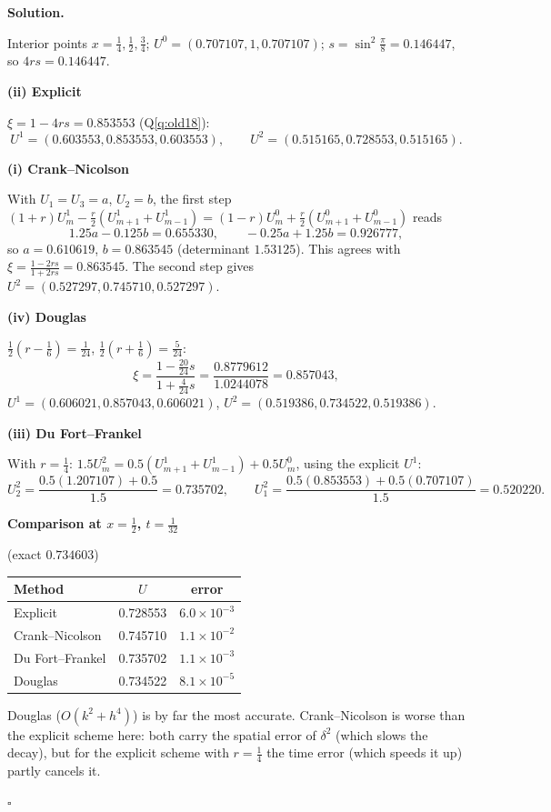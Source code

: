 \documentclass[11pt,a4paper]{article}
\newenvironment{solution}
  {\par\noindent\textbf{Solution.}\par\nobreak}
  {\par\nobreak\noindent\hfill\(\square\)\par}
\newcommand{\step}[1]{\par\addvspace{0.5em}\noindent\textbf{#1}\par\nobreak}
\begin{document}
\begin{solution}
Interior points \(x=\frac14,\frac12,\frac34\);
\(U^0=(0.707107,1,0.707107)\); \(s=\sin^2\frac\pi8=0.146447\), so
\(4rs=0.146447\).

\step{(ii) Explicit}
\(\xi=1-4rs=0.853553\) (Q\ref{q:old18}):
\[
  U^1=(0.603553,0.853553,0.603553),\qquad
  U^2=(0.515165,0.728553,0.515165).
\]

\step{(i) Crank--Nicolson}
With \(U_1=U_3=a\), \(U_2=b\), the first step
\((1+r)U_m^1-\frac r2(U_{m+1}^1+U_{m-1}^1)=(1-r)U_m^0+\frac r2(U_{m+1}^0+U_{m-1}^0)\)
reads
\[
  1.25a-0.125b=0.655330,\qquad -0.25a+1.25b=0.926777,
\]
so \(a=0.610619\), \(b=0.863545\) (determinant \(1.53125\)).  This agrees
with \(\xi=\frac{1-2rs}{1+2rs}=0.863545\).  The second step gives
\(U^2=(0.527297,0.745710,0.527297)\).

\step{(iv) Douglas}
\(\frac12(r-\frac16)=\frac1{24}\), \(\frac12(r+\frac16)=\frac5{24}\):
\[
  \xi=\frac{1-\frac{20}{24}s}{1+\frac4{24}s}=\frac{0.8779612}{1.0244078}=0.857043,
\]
\(U^1=(0.606021,0.857043,0.606021)\),
\(U^2=(0.519386,0.734522,0.519386)\).

\step{(iii) Du Fort--Frankel}
With \(r=\frac14\): \(1.5U_m^2=0.5(U_{m+1}^1+U_{m-1}^1)+0.5U_m^0\), using
the explicit \(U^1\):
\[
  U_2^2=\frac{0.5(1.207107)+0.5}{1.5}=0.735702,\qquad
  U_1^2=\frac{0.5(0.853553)+0.5(0.707107)}{1.5}=0.520220 .
\]

\step{Comparison at \(x=\frac12\), \(t=\frac1{32}\)} (exact \(0.734603\))
\begin{center}
\begin{tabular}{@{}lcc@{}}
\toprule
Method & \(U\) & error\\
\midrule
Explicit & 0.728553 & \(6.0\times10^{-3}\)\\
Crank--Nicolson & 0.745710 & \(1.1\times10^{-2}\)\\
Du Fort--Frankel & 0.735702 & \(1.1\times10^{-3}\)\\
Douglas & 0.734522 & \(8.1\times10^{-5}\)\\
\bottomrule
\end{tabular}
\end{center}
Douglas (\(O(k^2+h^4)\)) is by far the most accurate.  Crank--Nicolson
is worse than the explicit scheme here: both carry the spatial error of
\(\delta^2\) (which slows the decay), but for the explicit scheme with
\(r=\frac14\) the time error (which speeds it up) partly cancels it.
\end{solution}
\end{document}
